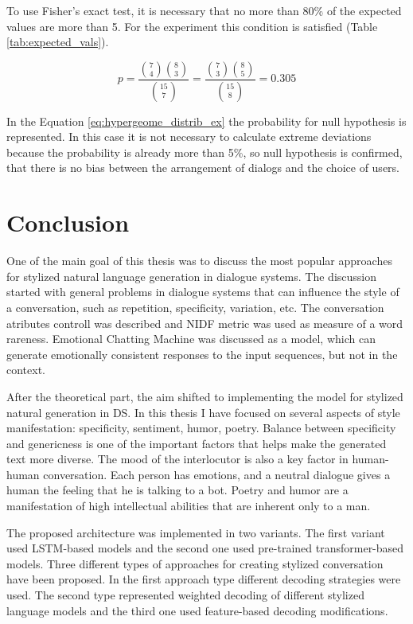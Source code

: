 To use Fisher's exact test, it is necessary that no more than 80\% of the expected values are more than 5. For the experiment this condition is satisfied (Table \ref{tab:expected_vals}).

\begin{equation} \label{eq:hypergeome_distrib_ex}
p = \frac{\binom{7}{4} \binom{8}{3}}{\binom{15}{7}} = \frac{\binom{7}{3} \binom{8}{5}}{\binom{15}{8}} = 0.305
\end{equation}

In the Equation \ref{eq:hypergeome_distrib_ex} the probability for null hypothesis is represented. In this case it is not necessary to calculate extreme deviations because the probability is already more than 5\%, so null hypothesis is confirmed, that there is no bias between the arrangement of dialogs and the choice of users.
\chapter{Conclusion} \label{conclusion}
One of the main goal of this thesis was to discuss the most popular approaches for stylized natural language generation in dialogue systems. The discussion started with general problems in dialogue systems that can influence the style of a conversation, such as repetition, specificity, variation, etc. The conversation atributes controll was described and NIDF metric was used as measure of a word rareness. Emotional Chatting Machine was discussed as a model, which can generate emotionally consistent responses to the input sequences, but not in the context.

After the theoretical part, the aim shifted to implementing the model for stylized natural generation in DS. In this thesis I have focused on several aspects of style manifestation: specificity, sentiment, humor, poetry. Balance between specificity and genericness is one of the important factors that helps make the generated text more diverse. The mood of the interlocutor is also a key factor in human-human conversation. Each person has emotions, and a neutral dialogue gives a human the feeling that he is talking to a bot. Poetry and humor are a manifestation of high intellectual abilities that are inherent only to a man.

The proposed architecture was implemented in two variants. The first variant used LSTM-based models and the second one used pre-trained transformer-based models. Three different types of approaches for creating stylized conversation have been proposed. In the first approach type different decoding strategies were used. The second type represented weighted decoding of different stylized language models and the third one used feature-based decoding modifications.

